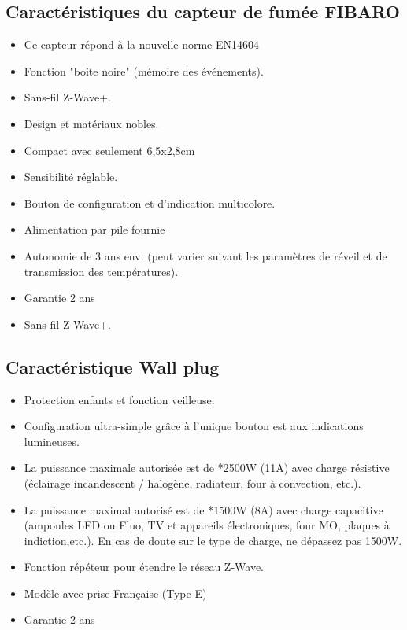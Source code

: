 \subsection{Caractéristiques du capteur de fumée FIBARO}

\begin{itemize}

\item Ce capteur répond à la nouvelle norme EN14604


\item Fonction "boite noire" (mémoire des événements).


\item Sans-fil Z-Wave+.


\item Design et matériaux nobles.


\item Compact avec seulement 6,5x2,8cm


\item Sensibilité réglable.


\item Bouton de configuration et d'indication multicolore.


\item Alimentation par pile fournie 


\item Autonomie de 3 ans env. (peut varier suivant les paramètres de réveil et de transmission des températures).


\item Garantie 2 ans


\item Sans-fil Z-Wave+.
\end{itemize}
\subsection{Caractéristique Wall plug}

\begin{itemize}

\item Protection enfants et fonction veilleuse.


\item Configuration ultra-simple grâce à l'unique bouton est aux indications lumineuses.


\item La puissance maximale autorisée est de *2500W (11A) avec charge résistive (éclairage incandescent / halogène, radiateur, four à convection, etc.).
    

\item La puissance maximal autorisé est de *1500W (8A) avec charge capacitive (ampoules LED ou Fluo, TV et appareils électroniques, four MO, plaques à indiction,etc.). En cas de doute sur le type de charge, ne dépassez pas 1500W.


\item Fonction répéteur pour étendre le réseau Z-Wave.


\item Modèle avec prise Française (Type E)


\item Garantie 2 ans 

\end{itemize}
